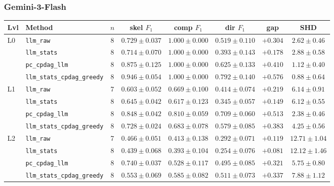 \subsubsection{Gemini-3-Flash}
\label{app:results:gemini3flash}

\begin{center}
\scriptsize
\setlength{\tabcolsep}{3.0pt}
\begin{tabular}{@{}l l c c c c c c@{}}
\toprule
Lvl & Method & $n$ & skel $F_1$ & comp $F_1$ & dir $F_1$ & gap & SHD \\
\midrule
L0 & \texttt{llm\_raw}                & 8 & $0.729 \pm 0.037$ & $1.000 \pm 0.000$ & $0.519 \pm 0.110$ & $+0.304$ & $2.62 \pm 0.46$ \\
   & \texttt{llm\_stats}              & 8 & $0.714 \pm 0.070$ & $1.000 \pm 0.000$ & $0.393 \pm 0.143$ & $+0.178$ & $2.88 \pm 0.58$ \\
   & \texttt{pc\_cpdag\_llm}          & 8 & $0.875 \pm 0.125$ & $1.000 \pm 0.000$ & $0.625 \pm 0.133$ & $+0.410$ & $1.12 \pm 0.40$ \\
   & \texttt{llm\_stats\_cpdag\_greedy} & 8 & $0.946 \pm 0.054$ & $1.000 \pm 0.000$ & $0.792 \pm 0.140$ & $+0.576$ & $0.88 \pm 0.64$ \\
\midrule
L1 & \texttt{llm\_raw}                & 7 & $0.603 \pm 0.052$ & $0.669 \pm 0.100$ & $0.414 \pm 0.074$ & $+0.219$ & $6.14 \pm 0.91$ \\
   & \texttt{llm\_stats}              & 8 & $0.645 \pm 0.042$ & $0.617 \pm 0.123$ & $0.345 \pm 0.057$ & $+0.149$ & $6.12 \pm 0.55$ \\
   & \texttt{pc\_cpdag\_llm}          & 8 & $0.848 \pm 0.042$ & $0.810 \pm 0.059$ & $0.709 \pm 0.060$ & $+0.513$ & $2.38 \pm 0.46$ \\
   & \texttt{llm\_stats\_cpdag\_greedy} & 8 & $0.728 \pm 0.024$ & $0.683 \pm 0.078$ & $0.579 \pm 0.085$ & $+0.383$ & $4.25 \pm 0.56$ \\
\midrule
L2 & \texttt{llm\_raw}                & 7 & $0.466 \pm 0.051$ & $0.413 \pm 0.138$ & $0.292 \pm 0.071$ & $+0.119$ & $12.71 \pm 1.04$ \\
   & \texttt{llm\_stats}              & 8 & $0.439 \pm 0.068$ & $0.393 \pm 0.104$ & $0.254 \pm 0.076$ & $+0.081$ & $12.12 \pm 1.46$ \\
   & \texttt{pc\_cpdag\_llm}          & 8 & $0.740 \pm 0.037$ & $0.528 \pm 0.117$ & $0.495 \pm 0.085$ & $+0.321$ & $5.75 \pm 0.80$ \\
   & \texttt{llm\_stats\_cpdag\_greedy} & 8 & $0.553 \pm 0.069$ & $0.585 \pm 0.082$ & $0.511 \pm 0.073$ & $+0.337$ & $7.88 \pm 1.12$ \\

\end{tabular}
\end{center}
